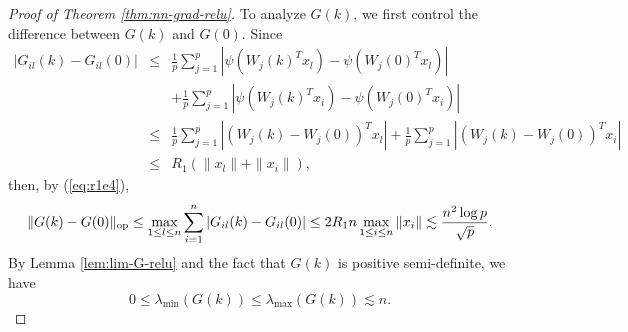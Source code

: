 \begin{proof}[Proof of Theorem \ref{thm:nn-grad-relu}]
To analyze $G(k)$, we first control the difference between $G(k)$ and $G(0)$. Since
\begin{eqnarray*}
|G_{il}(k) - G_{il}(0)| &\leq& \frac{1}{p}\sum_{j=1}^p|\psi(W_j(k)^Tx_l) - \psi(W_j(0)^Tx_l)| \\
&& + \frac{1}{p}\sum_{j=1}^p|\psi(W_j(k)^Tx_i) - \psi(W_j(0)^Tx_i)| \\
&\leq& \frac{1}{p}\sum_{j=1}^p|(W_j(k)-W_j(0))^Tx_l| + \frac{1}{p}\sum_{j=1}^p|(W_j(k)-W_j(0))^Tx_i| \\
&\leq& R_1\left(\|x_l\| + \|x_i\|\right),
\end{eqnarray*}
then, by (\ref{eq:r1e4}),
\begin{equation}
\opnorm{G(k)-G(0)}\leq\max_{1\leq l\leq n}\sum_{i=1}^n|G_{il}(k) - G_{il}(0)|\leq 2R_1n\max_{1\leq i\leq n}\|x_i\|\lesssim \frac{n^2\log p}{\sqrt{p}}. \label{eq:x-japan}
\end{equation}
By Lemma \ref{lem:lim-G-relu} and the fact that $G(k)$ is positive semi-definite, we have
\begin{equation}
0 \leq \lambda_{\min}(G(k)) \leq \lambda_{\max}(G(k)) \lesssim n. \label{eq:Gk-spec}
\end{equation}


\end{proof}
